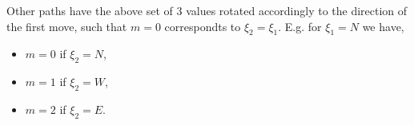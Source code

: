 \documentclass[%
 reprint,
 amsmath,amssymb,
 aps,
prb,
floatfix,
]{revtex4-1}
\begin{document}
Other paths have the above set of 3 values rotated accordingly to the direction of the first move, such that $m = 0$ correspondts to $\xi_2 = \xi_1$. E.g. for $\xi_1 = N$ we have,
\begin{itemize}	
	\item $m = 0$ if $\xi_2 = N$,
	\item $m = 1$ if $\xi_2 = W$,
	\item $m = 2$ if $\xi_2 = E$.
\end{itemize}


        

\end{document}
